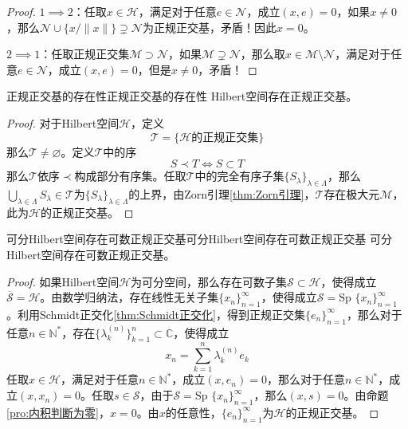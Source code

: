 \documentclass[lang = cn, scheme = chinese, thmcnt = section]{elegantbook}
\newcommand{\N}{\mathbb{N}}            %
\newcommand{\C}{\mathbb{C}}  		   %
\newcommand{\sub}{\subset}             %
\begin{document}
\begin{proof}
	$1\implies 2$：任取$x\in\mathcal{H}$，满足对于任意$e\in\mathcal{N}$，成立$(x,e)=0$，如果$x\ne 0$，那么$\mathcal{N}\cup\{ x/\|x\| \}\supsetneq \mathcal{N}$为正规正交基，矛盾！因此$x=0$。
	
	$2\implies 1$：任取正规正交集$\mathcal{M}\supset\mathcal{N}$，如果$\mathcal{M}\supsetneq\mathcal{N}$，那么取$x\in \mathcal{M}\setminus \mathcal{N}$，满足对于任意$e\in\mathcal{N}$，成立$(x,e)=0$，但是$x\ne 0$，矛盾！
\end{proof}

\begin{theorem}{正规正交基的存在性}{正规正交基的存在性}
	Hilbert空间存在正规正交基。
\end{theorem}

\begin{proof}
	对于Hilbert空间$\mathcal{H}$，定义
	$$
	\mathscr{T}=\{ \mathcal{H}\text{的正规正交集} \}
	$$
	那么$\mathscr{T}\ne\varnothing$。定义$\mathscr{T}$中的序
	$$
	S\prec T\iff S\sub T
	$$
	那么$\mathscr{T}$依序$\prec$构成部分有序集。任取$\mathscr{T}$中的完全有序子集$\{ S_\lambda \}_{\lambda\in\Lambda}$，那么$\displaystyle\bigcup_{\lambda\in\Lambda}S_\lambda\in \mathscr{T}$为$\{ S_\lambda \}_{\lambda\in\Lambda}$的上界，由Zorn引理\ref{thm:Zorn引理}，$\mathscr{T}$存在极大元$\mathcal{M}$，此为$\mathcal{H}$的正规正交基。
\end{proof}

\begin{theorem}{可分Hilbert空间存在可数正规正交基}{可分Hilbert空间存在可数正规正交基}
	可分Hilbert空间存在可数正规正交基。
\end{theorem}

\begin{proof}
	如果Hilbert空间$\mathcal{H}$为可分空间，那么存在可数子集$\mathcal{S}\sub \mathcal{H}$，使得成立$\overline{\mathcal{S}}=\mathcal{H}$。由数学归纳法，存在线性无关子集$\{ x_n \}_{n=1}^{\infty}$，使得成立$\mathcal{S}=\text{Sp }\{ x_n \}_{n=1}^{\infty}$。利用Schmidt正交化\ref{thm:Schmidt正交化}，得到正规正交集$\{ e_n \}_{n=1}^{\infty}$，那么对于任意$n\in\N^*$，存在$\{ \lambda_k^{(n)} \}_{k=1}^{n}\sub\C$，使得成立
	$$
	x_n=\sum_{k=1}^{n}\lambda_k^{(n)}e_k
	$$
	任取$x\in \mathcal{H}$，满足对于任意$n\in\N^*$，成立$(x,e_n)=0$，那么对于任意$n\in\N^*$，成立$(x,x_n)=0$。任取$s\in \mathcal{S}$，由于$\mathcal{S}=\text{Sp }\{ x_n \}_{n=1}^{\infty}$，那么$(x,s)=0$。由命题\ref{pro:内积判断为零}，$x=0$。由$x$的任意性，$\{ e_n \}_{n=1}^{\infty}$为$\mathcal{H}$的正规正交基。
\end{proof}
\end{document}
